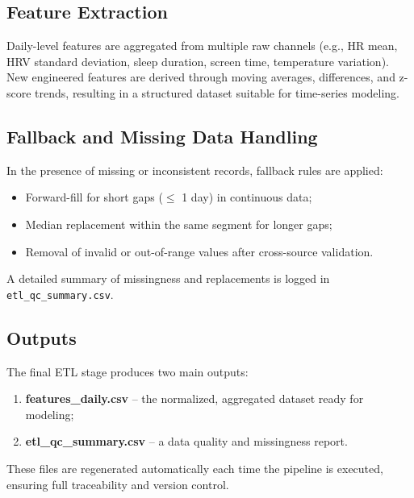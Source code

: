 \documentclass[12pt,a4paper]{article}
\begin{document}
\subsection*{Feature Extraction}
Daily-level features are aggregated from multiple raw channels (e.g., HR mean, HRV standard deviation, sleep duration, screen time, temperature variation). 
New engineered features are derived through moving averages, differences, and z-score trends, resulting in a structured dataset suitable for time-series modeling.

\subsection*{Fallback and Missing Data Handling}
In the presence of missing or inconsistent records, fallback rules are applied:
\begin{itemize}
    \item Forward-fill for short gaps ($\leq$ 1 day) in continuous data;
    \item Median replacement within the same segment for longer gaps;
    \item Removal of invalid or out-of-range values after cross-source validation.
\end{itemize}
A detailed summary of missingness and replacements is logged in \texttt{etl\_qc\_summary.csv}.

\subsection*{Outputs}
The final ETL stage produces two main outputs:
\begin{enumerate}
    \item \textbf{features\_daily.csv} – the normalized, aggregated dataset ready for modeling;
    \item \textbf{etl\_qc\_summary.csv} – a data quality and missingness report.
\end{enumerate}
These files are regenerated automatically each time the pipeline is executed, ensuring full traceability and version control.
\end{document}
